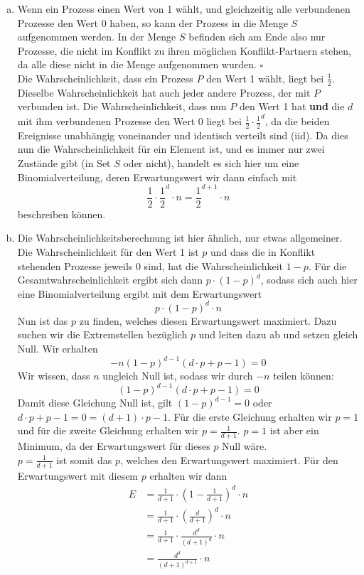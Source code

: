 \documentclass[12pt,a4paper]{article}
\begin{document}
\begin{enumerate}[a)]
	\item Wenn ein Prozess einen Wert von 1 wählt, und gleichzeitig alle verbundenen Prozesse den Wert 0 haben, so kann der Prozess in die Menge $S$ aufgenommen werden. In der Menge $S$ befinden sich am Ende also nur Prozesse, die nicht im Konflikt zu ihren möglichen Konflikt-Partnern stehen, da alle diese nicht in die Menge aufgenommen wurden. $\square$\\
		Die Wahrscheinlichkeit, dass ein Prozess $P$ den Wert 1 wählt, liegt bei $\frac{1}{2}$. Dieselbe Wahrscheinlichkeit hat auch jeder andere Prozess, der mit $P$ verbunden ist. Die Wahrscheinlichkeit, dass nun $P$ den Wert 1 hat \textbf{und} die $d$ mit ihm verbundenen Prozesse den Wert 0 liegt bei $\frac{1}{2} \cdot \frac{1}{2}^d$, da die beiden Ereignisse unabhängig voneinander und identisch verteilt sind (iid). Da dies nun die Wahrscheinlichkeit für ein Element ist, und es immer nur zwei Zustände gibt (in Set $S$ oder nicht), handelt es sich hier um eine Binomialverteilung, deren Erwartungswert wir dann einfach mit
		$$\frac{1}{2} \cdot \frac{1}{2}^d \cdot n = \frac{1}{2}^{d+1} \cdot n$$
		beschreiben können.

	\item Die Wahrscheinlichkeitsberechnung ist hier ähnlich, nur etwas allgemeiner. Die Wahrscheinlichkeit für den Wert 1 ist $p$ und dass die in Konflikt stehenden Prozesse jeweils 0 sind, hat die Wahrscheinlichkeit $1-p$. Für die Gesamtwahrscheinlichkeit ergibt sich dann $p \cdot (1-p)^d$, sodass sich auch hier eine Binomialverteilung ergibt mit dem Erwartungswert
		$$p \cdot (1-p)^d \cdot n$$
		Nun ist das $p$ zu finden, welches diesen Erwartungswert maximiert. Dazu suchen wir die Extremstellen bezüglich $p$ und leiten dazu ab und setzen gleich Null. Wir erhalten
		$$-n(1-p)^{d-1}(d \cdot p + p-1) = 0$$
		Wir wissen, dass $n$ ungleich Null ist, sodass wir durch $-n$ teilen können:
		$$(1-p)^{d-1}(d \cdot p + p-1) = 0$$
		Damit diese Gleichung Null ist, gilt $(1-p)^{d-1} = 0$ oder	$d \cdot p + p-1 = 0 = (d+1) \cdot p -1$. Für die erste Gleichung erhalten wir $p=1$ und für die zweite Gleichung erhalten wir $p=\frac{1}{d+1}$. $p=1$ ist aber ein Minimum, da der Erwartungswert für dieses $p$ Null wäre.\\
		$p=\frac{1}{d+1}$ ist somit das $p$, welches den Erwartungswert maximiert. Für den Erwartungswert mit diesem $p$ erhalten wir dann
		\begin{align*}
			E &= \frac{1}{d+1} \cdot \left(1 - \frac{1}{d+1}\right)^d \cdot n \\
			&= \frac{1}{d+1} \cdot \left(\frac{d}{d+1}\right)^d \cdot n \\
			&= \frac{1}{d+1} \cdot \frac{d^d}{(d+1)^d} \cdot n \\
			&= \frac{d^d}{(d+1)^{d+1}} \cdot n \\
		\end{align*}
		
\end{enumerate}
\end{document}
